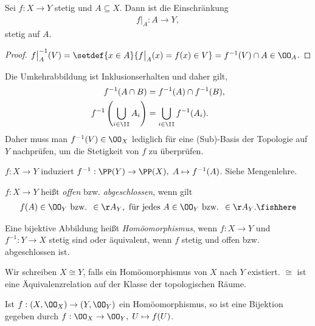 \begin{lem}
\label{prop:1.2.5}
Sei $f: X\to Y$ stetig und $A\subseteq X$. Dann ist die Einschränkung
\begin{align*}
f\big|_A: A\to Y,
\end{align*}
stetig auf $A$.\fishhere
\end{lem}
\begin{proof}
$f\big|_A^{-1}(V) = \setdef{x\in A}{f\big|_A(x) = f(x)\in V} = f^{-1}(V) \cap A
\in \OO_A$.\qedhere
\end{proof}

\begin{bem}
\label{bem:1.2.6}
Die Umkehrabbildung ist Inklusionserhalten und daher gilt,
\begin{align*}
f^{-1}(A\cap B) &=
f^{-1}(A)\cap f^{-1}(B),\\
f^{-1}\left(\bigcup\limits_{i\in \II} A_i \right) &= \bigcup\limits_{i\in \II}
f^{-1}(A_i).
\end{align*}
Daher muss man $f^{-1}(V)\in \OO_X$ lediglich für eine (Sub)-Basis der
Topologie auf $Y$ nachprüfen, um die Stetigkeit von $f$ zu überprüfen.\maphere
\end{bem}

\begin{bemn}
$f: X\to Y$ induziert $f^{-1}: \PP(Y) \to \PP(X),\; A\mapsto f^{-1}(A)$.
Siehe Mengenlehre.\maphere
\end{bemn}

\begin{defn}
\label{defn:1.2.7}
$f: X\to Y$ heißt \emph{offen} bzw. \emph{abgeschlossen}, wenn gilt
\begin{align*}
f(A) \in \OO_Y \text{ bzw. } \in \AA_Y, \text{ für jedes }
A\in\OO_Y\text{ bzw. }\in\AA_Y.\fishhere
\end{align*}
\end{defn}

\begin{defn}
\label{defn:1.2.8}
Eine bijektive Abbildung heißt \emph{Homöomorphismus}, wenn $f: X\to Y$ und
$f^{-1}: Y\to X$ stetig sind oder äquivalent, wenn $f$ stetig und offen bzw.
abgeschlossen ist.

Wir schreiben $X\cong Y$, falls ein Homöomorphismus von $X$ nach $Y$ existiert.
$\cong$ ist eine Äquivalenzrelation auf der Klasse der topologischen
Räume.\fishhere
\end{defn}
\begin{bemn}[Beachte:]
Ist $f: (X,\OO_X)\to (Y,\OO_Y)$ ein Homöomorphismus, so ist eine Bijektion
gegeben durch $f: \OO_X\to \OO_Y,\; U\mapsto f(U)$.\maphere
\end{bemn}

